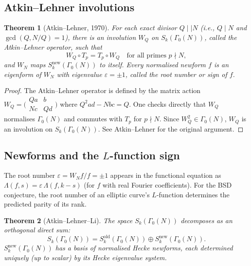 \documentclass[12pt,a4paper]{amsart}
\newtheorem{theorem}{Theorem}[section]
\theoremstyle{definition}
\begin{document}
\subsection{Atkin--Lehner involutions}

\begin{theorem}[Atkin--Lehner, 1970]
  For each exact divisor $Q \mid\mid N$ (i.e., $Q \mid N$ and $\gcd(Q, N/Q)=1$),
  there is an involution $W_Q$ on $S_k(\Gamma_0(N))$, called the
  \emph{Atkin--Lehner operator}, such that
  \[
    W_Q \circ T_p = T_p \circ W_Q \quad \text{for all primes } p \nmid N,
  \]
  and $W_N$ maps $S_k^{\mathrm{new}}(\Gamma_0(N))$ to itself.
  Every normalised newform $f$ is an eigenform of $W_N$ with eigenvalue
  $\varepsilon = \pm 1$, called the \emph{root number} or \emph{sign} of $f$.
\end{theorem}

\begin{proof}
  The Atkin--Lehner operator is defined by the matrix action
  $W_Q = \bigl(\begin{smallmatrix}Qa&b\\Nc&Qd\end{smallmatrix}\bigr)$ where
  $Q^2 ad - N bc = Q$. One checks directly that $W_Q$ normalises $\Gamma_0(N)$
  and commutes with $T_p$ for $p \nmid N$. Since $W_Q^2 \in \Gamma_0(N)$,
  $W_Q$ is an involution on $S_k(\Gamma_0(N))$. See Atkin--Lehner \cite{AtkinLehner}
  for the original argument.
\end{proof}

\subsection{Newforms and the $L$-function sign}

The root number $\varepsilon = W_N f / f = \pm 1$ appears in the functional
equation as $\Lambda(f,s) = \varepsilon\,\Lambda(f,k-s)$ (for $f$ with real
Fourier coefficients). For the BSD conjecture, the root number of an elliptic
curve's $L$-function determines the predicted parity of its rank.

\begin{theorem}[Atkin--Lehner--Li]\label{thm:al-li}
  The space $S_k(\Gamma_0(N))$ decomposes as an orthogonal direct sum:
  \[
    S_k(\Gamma_0(N)) = S_k^{\mathrm{old}}(\Gamma_0(N)) \oplus S_k^{\mathrm{new}}(\Gamma_0(N)).
  \]
  $S_k^{\mathrm{new}}(\Gamma_0(N))$ has a basis of normalised Hecke newforms,
  each determined uniquely (up to scalar) by its Hecke eigenvalue system.
\end{theorem}
\end{document}
